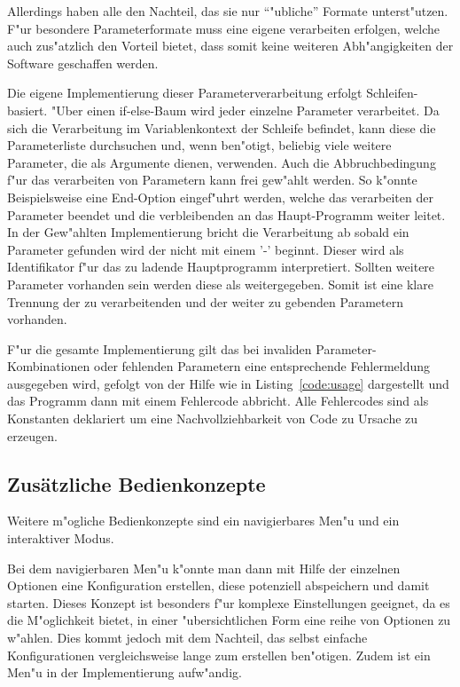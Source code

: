 Allerdings haben alle den Nachteil, das sie nur "`"ubliche"' Formate unterst"utzen. F"ur besondere Parameterformate muss eine eigene verarbeiten erfolgen, welche auch zus"atzlich den Vorteil bietet, dass somit keine weiteren Abh"angigkeiten der Software geschaffen werden.

Die eigene Implementierung dieser Parameterverarbeitung erfolgt Schleifen-basiert. "Uber einen if-else-Baum wird jeder einzelne Parameter verarbeitet. Da sich die Verarbeitung im Variablenkontext der Schleife befindet, kann diese die Parameterliste durchsuchen und, wenn ben"otigt, beliebig viele weitere Parameter, die als Argumente dienen, verwenden. Auch die Abbruchbedingung f"ur das verarbeiten von Parametern kann frei gew"ahlt werden. So k"onnte Beispielsweise eine End-Option eingef"uhrt werden, welche das verarbeiten der Parameter beendet und die verbleibenden an das Haupt-Programm weiter leitet. In der Gew"ahlten Implementierung bricht die Verarbeitung ab sobald ein Parameter gefunden wird der nicht mit einem '-' beginnt. Dieser wird als Identifikator f"ur das zu ladende Hauptprogramm interpretiert. Sollten weitere Parameter vorhanden sein werden diese als  weitergegeben. Somit ist eine klare Trennung der zu verarbeitenden und der weiter zu gebenden Parametern vorhanden.

F"ur die gesamte Implementierung gilt das bei invaliden Parameter-Kombinationen oder fehlenden Parametern eine entsprechende Fehlermeldung ausgegeben wird, gefolgt von der Hilfe wie in Listing~\ref{code:usage} dargestellt und das Programm dann mit einem Fehlercode abbricht. Alle Fehlercodes sind als Konstanten deklariert um eine Nachvollziehbarkeit von Code zu Ursache zu erzeugen.

 

\subsection{Zusätzliche Bedienkonzepte}

Weitere m"ogliche Bedienkonzepte sind ein navigierbares Men"u und ein interaktiver Modus.

Bei dem navigierbaren Men"u k"onnte man dann mit Hilfe der einzelnen Optionen eine Konfiguration erstellen, diese potenziell abspeichern und damit starten. Dieses Konzept ist besonders f"ur komplexe Einstellungen geeignet, da es die M"oglichkeit bietet, in einer "ubersichtlichen Form eine reihe von Optionen zu w"ahlen. Dies kommt jedoch mit dem Nachteil, das selbst einfache Konfigurationen vergleichsweise lange zum erstellen ben"otigen. Zudem ist ein Men"u in der Implementierung aufw"andig.

